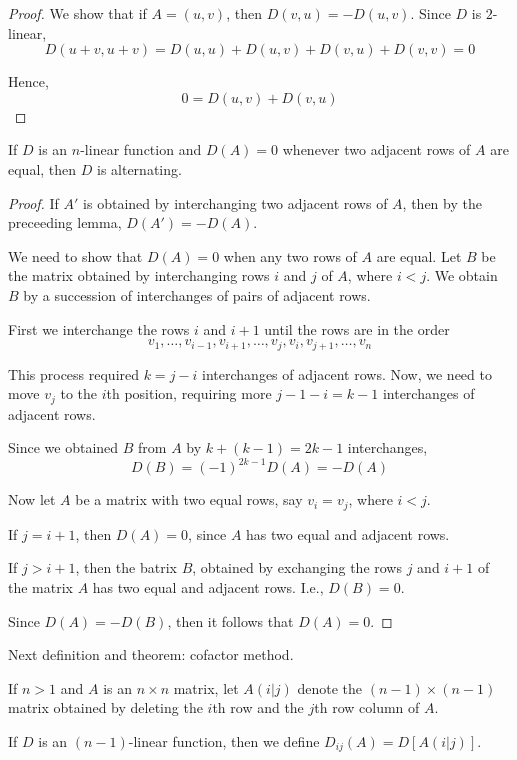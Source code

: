 \begin{proof}
	We show that if $A=(u,v)$, then $D(v,u) = -D(u,v)$. Since $D$ is $2$-linear,
	\[
		D(u+v, u+v) = D(u,u) + D(u,v) + D(v,u) + D(v,v) = 0
	\]

	Hence,
	\[
		0 = D(u,v) + D(v,u)
	\]
\end{proof}

\begin{lemma}
	If $D$ is an $n$-linear function and $D(A) = 0$ whenever two adjacent rows of $A$ are equal, then $D$ is alternating.
\end{lemma}

\begin{proof}
	If $A'$ is obtained by interchanging two adjacent rows of $A$, then by the preceeding lemma, $D(A') = -D(A)$. 

	We need to show that $D(A) = 0$ when any two rows of $A$ are equal. Let $B$ be the matrix obtained by interchanging rows $i$ and $j$ of $A$, where $i < j$. We obtain $B$ by a succession of interchanges of pairs of adjacent rows.

	First we interchange the rows $i$ and $i+1$ until the rows are in the order
	\[
		v_1, \ldots, v_{i-1}, v_{i+1}, \ldots, v_j, v_i, v_{j+1}, \ldots, v_n
	\]
	
	This process required $k = j-i$ interchanges of adjacent rows. Now, we need to move $v_j$ to the $i$th position, requiring more $j-1-i = k-1$ interchanges of adjacent rows.

	Since we obtained $B$ from $A$ by $k+(k-1) = 2k-1$ interchanges,
	\[
		D(B) = (-1)^{2k-1}D(A) = -D(A)
	\]

	Now let $A$ be a matrix with two equal rows, say $v_i = v_j$, where $i < j$.
	
	If $j = i+1$, then $D(A) = 0$, since $A$ has two equal and adjacent rows.

	If $j > i+1$, then the batrix $B$, obtained by exchanging the rows $j$ and $i+1$ of the matrix $A$ has two equal and adjacent rows. I.e., $D(B) = 0$.

	Since $D(A) = -D(B)$, then it follows that $D(A) = 0$.
\end{proof}

Next definition and theorem: cofactor method.

\begin{definition}
	If $n>1$ and $A$ is an $n \times n$ matrix, let $A(i|j)$ denote the $(n-1) \times (n-1)$ matrix obtained by deleting the $i$th row and the $j$th row column of $A$. 

	If $D$ is an $(n-1)$-linear function, then we define $D_{ij}(A) = D[A(i|j)]$.
\end{definition}

